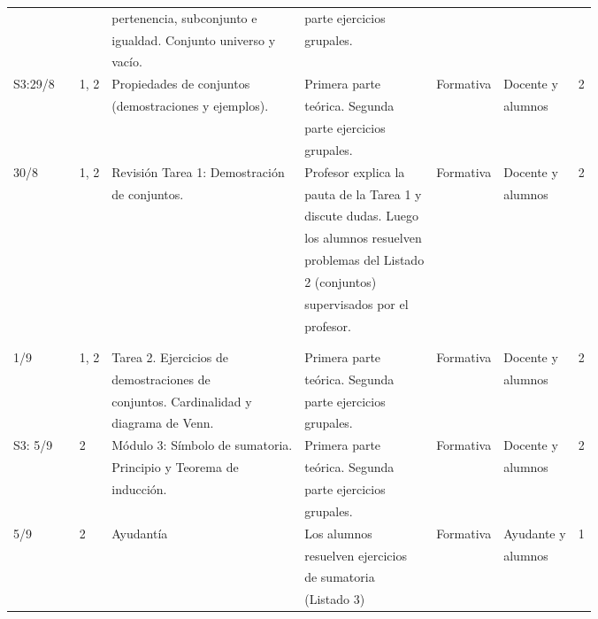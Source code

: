 \documentclass[11pt]{article}
\begin{document}
{\begin{center}
\begin{longtable}{|l|l|l|l|l|l|l|l|}
 & & & pertenencia, subconjunto e & parte ejercicios & & & \\
 & & & igualdad. Conjunto universo y & grupales. & & & \\
 & & & vacío. & & & & \\
\hline
S3:29/8 & & 1, 2 & Propiedades de conjuntos & Primera parte & Formativa & Docente y & 2 \\
 & & & (demostraciones y ejemplos). & teórica. Segunda & & alumnos & \\
 & & & & parte ejercicios & & & \\
 & & & & grupales. & & & \\
\hline
30/8 & & 1, 2 & Revisión Tarea 1: Demostración & Profesor explica la & Formativa & Docente y & 2 \\
 & & & de conjuntos. & pauta de la Tarea 1 y & & alumnos & \\
 & & & & discute dudas. Luego & & & \\
 & & & & los alumnos resuelven & & & \\
 & & & & problemas del Listado & & & \\
 & & & & 2 (conjuntos) & & & \\
 & & & & supervisados por el & & & \\
 & & & & profesor. & & & \\
 & & & & & & & \\
 & & & & & & & \\
\hline
1/9 & & 1, 2 & Tarea 2. Ejercicios de & Primera parte & Formativa & Docente y & 2 \\
 & & & demostraciones de & teórica. Segunda & & alumnos & \\
 & & & conjuntos. Cardinalidad y & parte ejercicios & & & \\
 & & & diagrama de Venn. & grupales. & & & \\
\hline
S3: 5/9 & & 2 & Módulo 3: Símbolo de sumatoria. & Primera parte & Formativa & Docente y & 2 \\
 & & & Principio y Teorema de & teórica. Segunda & & alumnos & \\
 & & & inducción. & parte ejercicios & & & \\
 & & & & grupales. & & & \\
\hline
5/9 & & 2 & Ayudantía & Los alumnos & Formativa & Ayudante y & 1 \\
 & & & & resuelven ejercicios & & alumnos & \\
 & & & & de sumatoria & & & \\
 & & & & (Listado 3) & & & \\

\end{longtable}
\end{center}}
\end{document}
